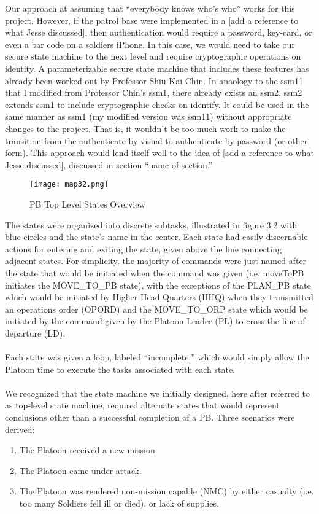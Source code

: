 Our approach at assuming that “everybody knows who’s who” works for this project.
However, if the patrol base were implemented in a [add a reference to what Jesse discussed],
then authentication would require a password, key-card, or even a bar code on a soldiers
iPhone. In this case, we would need to take our secure state machine to the next level and
require cryptographic operations on identity. A parameterizable secure state machine that
includes these features has already been worked out by Professor Shiu-Kai Chin. In anaology
to the ssm11 that I modified from Professor Chin’s ssm1, there already exists an ssm2. ssm2
extends ssm1 to include cryptographic checks on identify. It could be used in the same manner
as ssm1 (my modified version was ssm11) without appropriate changes to the project. That is,
it wouldn’t be too much work to make the transition from the authenticate-by-visual to
authenticate-by-password (or other form). This approach would lend itself well to the idea
of [add a reference to what Jesse discussed], discussed in section “name of section.”
\begin{figure}[h]
  \centering
  \texttt{[image: map32.png]}
  \caption{PB Top Level States Overview}
\end{figure}
The states were organized into discrete subtasks, illustrated in figure 3.2
with blue circles and the state’s name in the center. Each state had easily
discernable actions for entering and exiting the state, given above the line
connecting adjacent states. For simplicity, the majority of commands were
just named after the state that would be initiated when the command was given
(i.e. moveToPB initiates the MOVE_TO_PB state), with the exceptions of the
PLAN_PB state which would be initiated by Higher Head Quarters (HHQ) when they
transmitted an operations order (OPORD) and the MOVE_TO_ORP state which would be
initiated by the command given by the Platoon Leader (PL) to cross the line of
departure (LD).\\\\
Each state was given a loop, labeled “incomplete,” which would simply
allow the Platoon time to execute the tasks associated with each state.\\\\
We recognized that the state machine we initially designed, here after
referred to as top-level state machine, required alternate states that
would represent conclusions other than a successful completion of a PB.
Three scenarios were derived:
\begin{enumerate}
\item The Platoon received a new mission.
\item The Platoon came under attack.
\item The Platoon was rendered non-mission capable (NMC) by either
  casualty (i.e. too many Soldiers fell ill or died), or lack of supplies.
\end{enumerate}
